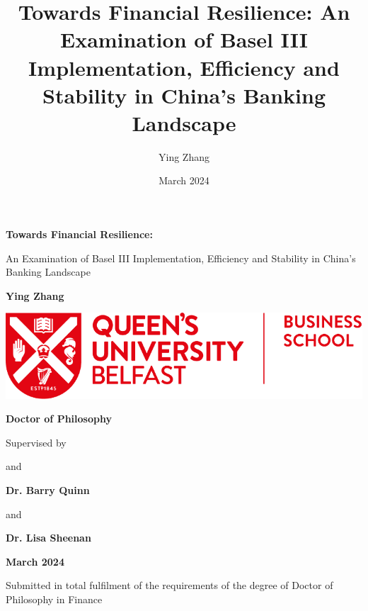 \documentclass[
  12pt,
  a4paper,
]{scrreprt}
\title{Towards Financial Resilience: An Examination of Basel III
Implementation, Efficiency and Stability in China's Banking Landscape}
\author{Ying Zhang}
\date{March 2024}
\begin{document}
  \begin{titlepage}
  \begin{center}
          \vspace*{1cm}
              
          \Huge
          \textbf{Towards Financial Resilience:}
          
          \vspace{0.3cm}
          \LARGE An Examination of Basel III Implementation, Efficiency and Stability in China's Banking Landscape
          \vspace{1cm}
              
          \textbf{Ying Zhang}
              
          \vfill
          
          \includegraphics[width=8\textwidth]{frontmatter/QBSlogo.png}
          
          \bfseries\large Doctor of Philosophy \par
          
          \vspace{1cm}
          
          \small Supervised by\par
          \vspace{0.5cm}
          \small and\par
          \bfseries\large Dr. Barry Quinn\par
          \vspace{0.4cm}
          \small and\par
          \vspace{0.4cm}
          \bfseries\large Dr. Lisa Sheenan\par
          \vspace{2cm}
          
          \bfseries\small March 2024 \par
          \small Submitted in total fulfilment of the requirements of the degree of Doctor of Philosophy in Finance\par
          \vspace{0.8cm}
          
      \end{center}  
  \end{titlepage}
\end{document}
